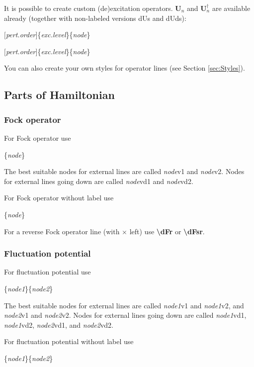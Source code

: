 \documentclass[a4paper]{article}
\newcommand{\myind}{\hspace{10pt}}
\begin{document}
It is possible to create custom (de)excitation operators. ${\mathbf U}_n $ and ${\mathbf U}^\dagger_n $ are 
available already (together with non-labeled versions dUs and dUds):

\myind{\bf \textbackslash dU}$[${\it pert.order}$]$\{{\it exc.level}\}\{{\it node}\}

\myind{\bf \textbackslash dUd}$[${\it pert.order}$]$\{{\it exc.level}\}\{{\it node}\}

You can also create your own styles for operator lines (see Section \ref{sec:Styles}).

\subsection{Parts of Hamiltonian}

\subsubsection{Fock operator}

For Fock operator use

\myind{\bf \textbackslash dF}\{{\it node}\}

The best suitable nodes for external lines are called {\it node}v1 and {\it node}v2. 
Nodes for external lines going down are called {\it node}vd1 and {\it node}vd2.

For Fock operator without label use

\myind{\bf \textbackslash dFs}\{{\it node}\}

For a reverse Fock operator line (with $\times$ left) use {\bf \textbackslash dFr} or {\bf \textbackslash dFsr}.

\subsubsection{Fluctuation potential}

For fluctuation potential use

\myind{\bf \textbackslash dW}\{{\it node1}\}\{{\it node2}\}

The best suitable nodes for external lines are called {\it node1}v1 and {\it node1}v2, 
and {\it node2}v1 and {\it node2}v2.
Nodes for external lines going down are called {\it node1}vd1, {\it node1}vd2, 
{\it node2}vd1, and {\it node2}vd2.

For fluctuation potential without label use

\myind{\bf \textbackslash dWs}\{{\it node1}\}\{{\it node2}\}
\end{document}

